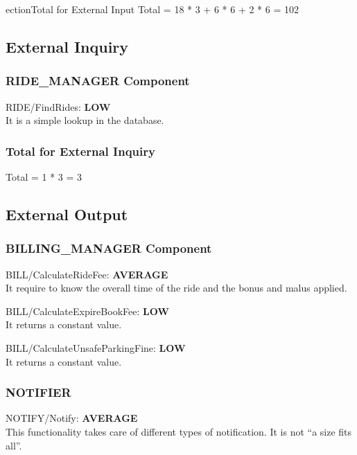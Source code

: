 \documentclass[11pt]{article} %
\newcommand{\extInput}[3]{ #1:  \textbf{#2} \\ #3  }
\begin{document}
\subsubs
ection{Total for External Input}
Total = 18 * 3 + 6 * 6 + 2 * 6 =  102

\subsection{External Inquiry}

\subsubsection{RIDE\_MANAGER Component}
\begin{description}
	\item \extInput
		{RIDE/FindRides}
		{LOW}
		{It is a simple lookup in the database.}
\end{description}

\subsubsection{Total for External Inquiry}
Total = 1 * 3 = 3

\subsection{External Output}

\subsubsection{BILLING\_MANAGER Component}
\begin{description}
	\item \extInput
		{BILL/CalculateRideFee}
		{AVERAGE}
		{It require to know the overall time of the ride and the bonus and malus applied.}
	\item \extInput
		{BILL/CalculateExpireBookFee}
		{LOW}
		{It returns a constant value.}
	\item \extInput
		{BILL/CalculateUnsafeParkingFine}
		{LOW}
		{It returns a constant value.}
\end{description}

\subsubsection{NOTIFIER}
\begin{description}
	\item \extInput
		{NOTIFY/Notify}
		{AVERAGE}
		{This functionality takes care of different types of notification. It is not ``a size fits all''.}
\end{description}
\end{document}
